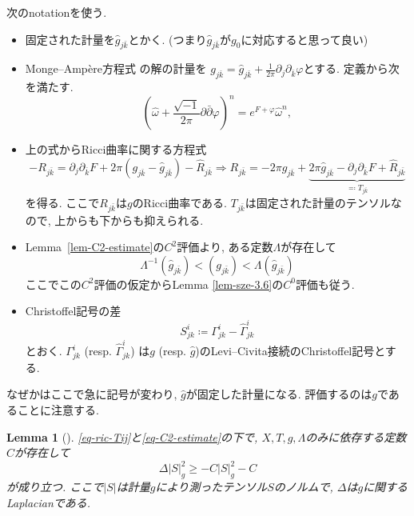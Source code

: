 \documentclass[dvipdfmx,a4paper,11pt]{article} %
\newtheorem{lem}[thm]{Lemma}
\theoremstyle{definition}
\theoremstyle{remark}
\numberwithin{equation}{section}
\begin{document}
次のnotationを使う.
\begin{tcolorbox}[mybox]
\begin{itemize}
\item 固定された計量を$\hat g_{j\bar k}$とかく. (つまり$\hat g_{j\bar k}$が$g_0$に対応すると思って良い)
\item Monge--Amp\`ere方程式
の解の計量を
\(
g_{j\bar k}=\hat g_{j\bar k}+\frac{1}{2\pi}\partial_{j}\partial_{\bar k}\varphi
\)とする. 定義から次を満たす. 
\begin{equation*}
\left(\hat{\omega}+\frac{\sqrt{-1}}{2\pi}\partial\bar\partial\varphi\right)^n=e^{F+\varphi}\hat{\omega}^n,
\end{equation*}
\item 上の式からRicci曲率に関する方程式
\begin{equation}
\label{eq-ric-Tij}
-R_{j\bar k}
=\partial_j\partial_{\bar k}F+2\pi(g_{j\bar k}-\hat{g}_{j\bar k})
-\hat{R}_{j\bar k}
\Rightarrow 
R_{j\bar k}=-2\pi g_{j\bar k}+
\underbrace{2\pi\hat{g}_{j\bar k}-\partial_j\partial_{\bar k}F +\hat{R}_{j\bar k}}_{\eqqcolon T_{j\bar k}}
\end{equation}
を得る. ここで$R_{j\bar k}$は$g$のRicci曲率である.
$T_{j\bar k}$は固定された計量のテンソルなので, 上からも下からも抑えられる. 
\item Lemma~\ref{lem-C2-estimate}の$C^2$評価より, ある定数$\Lambda$が存在して
\begin{equation}
\label{eq-C2-estimate}
\Lambda^{-1}(\hat g_{j\bar k})<(g_{j\bar k})<\Lambda(\hat g_{j\bar k})
\end{equation}
ここでこの$C^2$評価の仮定からLemma \ref{lem-sze-3.6}の$C^0$評価も従う. 
\item Christoffel記号の差
\begin{equation}
\label{eq-Sijk-defn}
S^{i}_{jk}\coloneqq \Gamma^{i}_{jk}-\hat\Gamma^{i}_{jk}
\end{equation}
とおく. $\Gamma^{i}_{jk}$ (resp. $\hat\Gamma^{i}_{jk}$) は$g$ (resp. $\hat g$)のLevi--Civita接続のChristoffel記号とする. 
\end{itemize}
\end{tcolorbox}
なぜか\cite[Subsection 3.3]{Sze14}はここで急に記号が変わり, $\hat g$が固定した計量になる. 
評価するのは$g$であることに注意する. 
\begin{lem}[{\cite[Lemma 3.9]{Sze14}}]
\label{lem-deltaS-estimate}
\eqref{eq-ric-Tij}と\eqref{eq-C2-estimate}の下で, $X,T,\hat g,\Lambda$のみに依存する定数$C$が存在して
\[
\Delta \lvert S\rvert_{g}^{2}\geq -C\lvert S\rvert_{g}^{2}-C
\]
が成り立つ. ここで$\lvert S\rvert$は計量$g$により測ったテンソル$S$のノルムで, $\Delta$は$g$に関するLaplacianである.
\end{lem}
\end{document}

